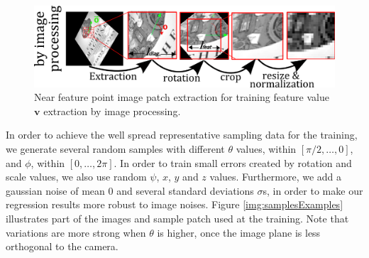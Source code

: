 \documentclass[annual]{acmsiggraph}
\begin{document}
\begin{figure}[h]
\center
\includegraphics[width =\columnwidth]{images/patchExtraction_misky.png}
\caption{Near feature point image patch extraction for training feature value $\mathbf{v}$ extraction by image processing.}
\label{img:imgPatchSearch}
\end{figure}
%


In order to achieve the well spread representative sampling data for the training, we generate several random samples with different $\theta$ values, within $[\pi/2, \ldots ,0]$, and $\phi$, within $[0,\ldots,2\pi]$. In order to train small errors created by rotation and scale values, we also use random $\psi$, $x$, $y$ and $z$ values. Furthermore, we add a gaussian noise of mean $0$ and several standard deviations $\sigma$s, in order to make our regression results more robust to image noises. Figure \ref{img:samplesExamples} illustrates part of the images and sample patch used at the training. Note that variations are more strong when $\theta$ is higher, once the image plane is less orthogonal to the camera.  
\end{document}

